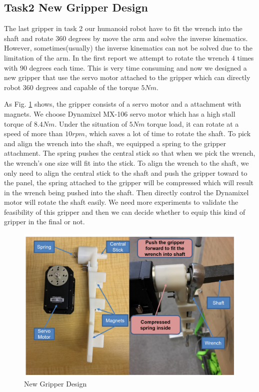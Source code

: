 \subsection{Task2 New Gripper Design}
The last gripper in task 2 our humanoid robot have to fit the wrench into the shaft and rotate $360$ degrees by move the arm and solve the inverse kinematics. However, sometimes(usually) the inverse kinematics can not be solved due to the limitation of the arm. In the first report we attempt to rotate the wrench $4$ times with $90$ degrees each time. This is very time consuming and now we designed a new gripper that use the servo motor attached to the gripper which can directly robot $360$ degrees and capable of the torque $5Nm$. 

As Fig. \ref{gripper} shows, the gripper consists of a servo motor and a attachment with magnets. We choose Dynamixel MX-106 servo motor which has a high stall torque of $8.4 Nm$. Under the situation of $5 Nm$ torque load, it can rotate at a speed of more than $10 rpm$, which saves a lot of time to rotate the shaft. To pick and align the wrench into the shaft, we equipped a spring to the gripper attachment. The spring pushes the central stick so that when we pick the wrench, the wrench's one size will fit into the stick. To align the wrench to the shaft, we only need to align the central stick to the shaft and push the gripper toward to the panel, the spring attached to the gripper will be compressed which will result in the wrench being pushed into the shaft. Then directly control the Dynamixel motor will rotate the shaft easily. We need more experiments to validate the feasibility of this gripper and then we can decide whether to equip this kind of gripper in the final or not.

 \begin{figure}%
    \begin{center}
    \includegraphics[keepaspectratio=true, width=1\linewidth, height=0.3\textheight]{sections//task2//images//gripper.png}
      \end{center}
    \caption{New Gripper Design}
    \label{gripper}
 \end{figure}

